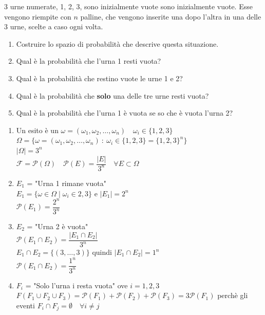 \documentclass[12pt]{report}
\newcounter{exercise}
\begin{document}
	\begin{exercise}{}{}
		\begin{assignment}{}{}
			3 urne numerate, 1, 2, 3, sono inizialmente vuote sono inizialmente vuote. Esse vengono riempite con $n$ palline, che vengono inserite una dopo l'altra in una delle 3 urne, scelte a caso ogni volta.
			\begin{enumerate}
				\item Costruire lo spazio di probabilità che descrive questa situazione.
				\item Qual è la probabilità che l'urna 1 resti vuota?
				\item Qual è la probabilità che restino vuote le urne 1 e 2?
				\item Qual è la probabilità che \textbf{solo} una delle tre urne resti vuota?
				\item Qual è la probabilità che l'urna 1 è vuota se so che è vuota l'urna 2?
			\end{enumerate}
		\end{assignment}
		\begin{enumerate}
			\item Un esito è un $\omega = (\omega_1, \omega_2, \dots, \omega_n) \quad \omega_i \in \{1, 2, 3\}$ \\
			$\Omega = \{\omega = (\omega_1, \omega_2, \dots, \omega_n)\ : \ \omega_i \in \{1, 2, 3\} = \{1, 2, 3\}^n\}$ \\
			$|\Omega| = 3^n$ \\
			$\mathcal{F} = \mathcal{P}(\Omega) \quad \mathcal{P}(E) = \dfrac{|E|}{3^n} \quad \forall E \subset \Omega$
			\item $E_1$ = "Urna 1 rimane vuota" \\
			$E_1 = \{\omega \in \Omega \mid \omega_i \in {2, 3}\}$ e $|E_1| = 2^n$ \\
			$\mathcal{P}(E_1) = \dfrac{2^n}{3^n}$
			\item $E_2$ = "Urna 2 è vuota" \\
			$\mathcal{P}(E_1 \cap E_2) = \dfrac{|E_1 \cap E_2|}{3^n}$ \\
			$E_1 \cap E_2 = \{(3, \dots, 3)\}$ quindi $|E_1 \cap E_2| = 1^n$ \\
			$\mathcal{P}(E_1 \cap E_2) = \dfrac{1^n}{3^n}$
			\item $F_i$ = "Solo l'urna i resta vuota" ove $i = 1, 2, 3$ \\
			$F(F_1 \cup F_2 \cup F_3) = \mathcal{P}(F_1) + \mathcal{P}(F_2) + \mathcal{P}(F_3) = 3\mathcal{P}(F_1)$ perchè gli eventi $F_i \cap F_j = \emptyset \quad \forall i \neq j$ \\

\end{enumerate}
\end{exercise}
\end{document}
